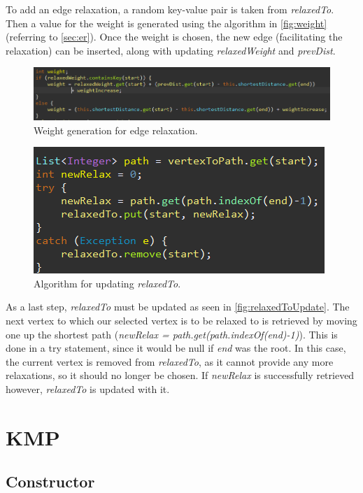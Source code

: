 \documentclass{l4proj}
\begin{document}
To add an edge relaxation, a random key-value pair is taken from \emph{relaxedTo}. Then a value for the weight is generated using the algorithm in \autoref{fig:weight} (referring to \autoref{sec:er}). Once the weight is chosen, the new edge (facilitating the relaxation) can be inserted, along with updating \emph{relaxedWeight} and \emph{prevDist}.

\begin{figure}
    \centering
    \includegraphics[width=0.99\linewidth]{images/weight.png}    

    \caption{Weight generation for edge relaxation.}
    \label{fig:weight} 
\end{figure}

\begin{figure}
    \centering
    \includegraphics[width=0.5\linewidth]{images/relaxedToUpdate.png}    

    \caption{Algorithm for updating \emph{relaxedTo}.}
    \label{fig:relaxedToUpdate} 
\end{figure}

As a last step, \emph{relaxedTo} must be updated as seen in \autoref{fig:relaxedToUpdate}. The next vertex to which our selected vertex is to be relaxed to is retrieved by moving one up the shortest path (\emph{newRelax = path.get(path.indexOf(end)-1)}). This is done in a try statement, since it would be null if \emph{end} was the root. In this case, the current vertex is removed from \emph{relaxedTo}, as it cannot provide any more relaxations, so it should no longer be chosen. If \emph{newRelax} is successfully retrieved however, \emph{relaxedTo} is updated with it.

\section{KMP}

\subsection{Constructor}
\end{document}
